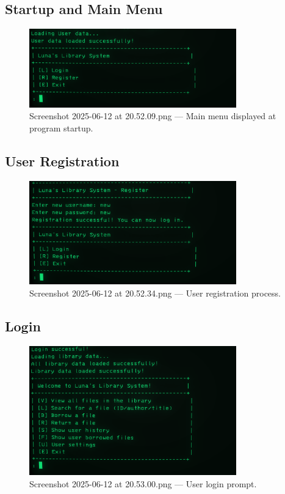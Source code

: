 \documentclass[a4paper,12pt]{article}
\begin{document}
\subsection{Startup and Main Menu}
\begin{figure}[ht!]
    \centering
    \includegraphics[width=0.8\textwidth]{Screenshot 2025-06-12 at 20.52.09.png}
    \caption{Screenshot 2025-06-12 at 20.52.09.png --- Main menu displayed at program startup.}
\end{figure}

\subsection{User Registration}
\begin{figure}[ht!]
    \centering
    \includegraphics[width=0.8\textwidth]{Screenshot 2025-06-12 at 20.52.34.png}
    \caption{Screenshot 2025-06-12 at 20.52.34.png --- User registration process.}
\end{figure}

\subsection{Login}
\begin{figure}[ht!]
    \centering
    \includegraphics[width=0.8\textwidth]{Screenshot 2025-06-12 at 20.53.00.png}
    \caption{Screenshot 2025-06-12 at 20.53.00.png --- User login prompt.}
\end{figure}
\end{document}
